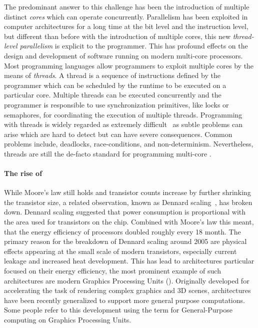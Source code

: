 The predominant answer to this challenge has been the introduction of multiple distinct \emph{cores} which can operate concurrently.
Parallelism has been exploited in computer architectures for a long time at the bit level and the instruction level, but different than before with the introduction of multiple cores, this new \emph{thread-level parallelism} is explicit to the programmer.
This has profound effects on the design and development of software running on modern multi-core processors.
Most programming languages allow programmers to exploit multiple cores by the means of \emph{threads}.
A thread is a sequence of instructions defined by the programmer which can be scheduled by the runtime to be executed on a particular core.
Multiple threads can be executed concurrently and the programmer is responsible to use synchronization primitives, like locks or semaphores, for coordinating the execution of multiple threads.
Programming with threads is widely regarded as extremely difficult~\cite{} as subtle problems can arise which are hard to detect but can have severe consequences.
Common problems include, deadlocks, race-conditions, and non-determinism.
Nevertheless, threads are still the de-facto standard for programming multi-core \CPUs.

\paragraph{The rise of \GPUs}
While Moore's law still holds and transistor counts increase by further shrinking the transistor size, a related observation, known as Dennard scaling~\cite{}, has broken down.
Dennard scaling suggested that power consumption is proportional with the area used for transistors on the chip.
Combined with Moore's law this meant, that the energy efficiency of processors doubled roughly every 18 month.
The primary reason for the breakdown of Dennard scaling around 2005 are physical effects appearing at the small scale of modern transistors, especially current leakage and increased heat development.
This has lead to architectures particular focused on their energy efficiency, the most prominent example of such architectures are modern Graphics Processing Units (\GPUs).
Originally developed for accelerating the task of rendering complex graphics and 3D scenes, \GPUs architectures have been recently generalized to support more general purpose computations.
Some people refer to this development using the term \GPGPU for General-Purpose computing on Graphics Processing Units.

